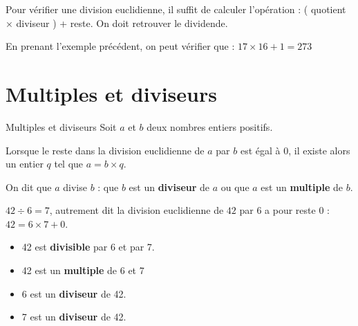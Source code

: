 \begin{pageCours}
\begin{Mt}
Pour vérifier une division euclidienne, il suffit de calculer l'opération : ( quotient × diviseur ) + reste. On doit retrouver le dividende.

En prenant l'exemple précédent, on peut vérifier que : $17\times16+1=273$
\end{Mt}

\section{Multiples et diviseurs}

\begin{DefT}{Multiples et diviseurs}
Soit $a$ et $b$ deux nombres entiers positifs.

Lorsque le reste dans la division euclidienne de $a$ par $b$ est égal à $0$, il existe alors un entier $q$ tel que $a=b\times q$.

On dit que $a$ divise $b$ : que $b$ est un \textbf{diviseur} de $a$ ou que $a$ est un \textbf{multiple} de $b$.
\end{DefT}

\begin{Ex}
\(42\div6=7\), autrement dit la division euclidienne de $42$ par $6$ a pour reste $0$ : \(42=6\times7+0\).\\

\begin{itemize}
    \item 42 est \textbf{divisible} par 6 et par 7.
    \item 42 est un \textbf{multiple} de 6 et 7
    \item 6 est un \textbf{diviseur} de 42.
    \item 7 est un \textbf{diviseur} de 42.
\end{itemize}
\end{Ex} 
\end{pageCours} 

